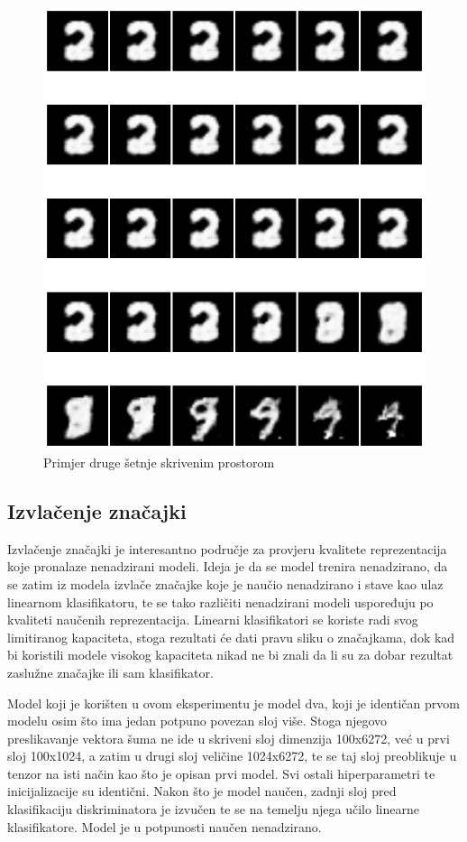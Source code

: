 \documentclass[times, utf8, diplomski]{fer}
\begin{document}
\begin{figure}[H]
    \centering
    \includegraphics[scale=0.65]{Slike/latentwalk1}
    \caption{Primjer druge šetnje skrivenim prostorom}
\end{figure}

\subsection{Izvlačenje značajki}
Izvlačenje značajki je interesantno područje za provjeru kvalitete reprezentacija koje pronalaze nenadzirani modeli. Ideja je da se model trenira nenadzirano, da se zatim iz modela izvlače značajke koje je naučio nenadzirano i stave kao ulaz linearnom klasifikatoru, te se tako različiti nenadzirani modeli uspoređuju po kvaliteti naučenih reprezentacija. Linearni klasifikatori se koriste radi svog limitiranog kapaciteta, stoga rezultati će dati pravu sliku o značajkama, dok kad bi koristili modele visokog kapaciteta nikad ne bi znali da li su za dobar rezultat zaslužne značajke ili sam klasifikator. \par

Model koji je korišten u ovom eksperimentu je model dva, koji je identičan prvom modelu osim što ima jedan potpuno povezan sloj više. Stoga njegovo preslikavanje vektora šuma ne ide u skriveni sloj dimenzija 100x6272, već u prvi sloj 100x1024, a zatim u drugi sloj veličine 1024x6272, te se taj sloj preoblikuje u tenzor na isti način kao što je opisan prvi model. Svi ostali hiperparametri te inicijalizacije su identični. Nakon što je model naučen, zadnji sloj pred klasifikaciju diskriminatora je izvučen te se na temelju njega učilo linearne klasifikatore. Model je u potpunosti naučen nenadzirano. \par
\end{document}
